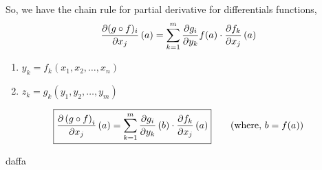 \documentclass[../Analysis-3]{subfiles}
\begin{document}
So, we have the chain rule for partial derivative for differentials functions,
\[ \pdv{(g\circ f)_{i}}{x_j}\left( a \right) = \sum_{k = 1}^{m} \pdv{g_i}{y_k}f(a)\cdot\pdv{f_k}{x_j}\left( a \right) \]

\begin{notnBox}
    \begin{enumerate}
        \item $y_k = f_k \left( x_1, x_2, \ldots, x_n \right)$
        \item $z_k = g_k \left( y_1, y_2, \ldots, y_m \right)$
    \end{enumerate}
\end{notnBox}

\begin{align*}
    \boxed{
        \pdv{\left( g\circ f \right)_i}{x_j}\left( a \right) = \sum_{k = 1}^{m} \pdv{g_i}{y_k}\left( b \right)\cdot\pdv{f_k}{x_j}\left( a \right)
    } \tag{where, $b = f(a)$}
\end{align*}

daffa
\end{document}
